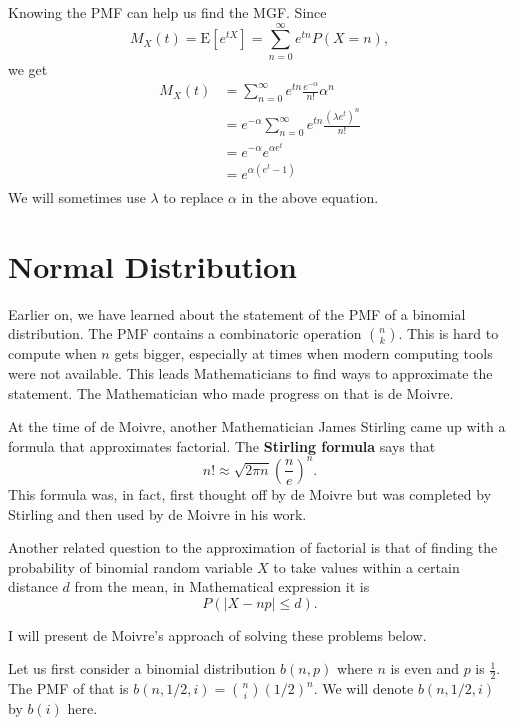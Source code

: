 \documentclass[11pt, a4paper, oneside]{book}
\theoremstyle{definition}
\newcommand{\E}[1]{\text{E}[#1]}
\begin{document}
\noindent Knowing the PMF can help us find the MGF. Since \[
M_X(t) = \E{e^{tX}} =\sum_{n=0}^{\infty} e^{tn}P(X=n),
\]
we get
\begin{equation*}
\begin{split}
M_X(t) &= \sum_{n=0}^{\infty} e^{tn}\frac{e^{-\alpha}}{n!}\alpha^n \\
&= e^{-\alpha} \sum_{n=0}^{\infty} e^{tn}\frac{(\lambda e^{t})^n}{n!} \\
&= e^{-\alpha} e^{\alpha e^t} \\ 
&= e^{\alpha(e^t - 1)} \\ 
\end{split}
\end{equation*}
We will sometimes use $\lambda$ to replace $\alpha$ in the above equation. 

\section{Normal Distribution}

\noindent Earlier on, we have learned about the statement of the PMF of a binomial distribution. The PMF contains a combinatoric operation $n \choose k$. This is hard to compute when $n$ gets bigger, especially at times when modern computing tools were not available. This leads Mathematicians to find ways to approximate the statement. The Mathematician who made progress on that is de Moivre.

\noindent At the time of de Moivre, another Mathematician James Stirling came up with a formula that approximates factorial. The \textbf{Stirling formula} says that\[
n! \approx \sqrt{2\pi n}(\frac{n}{e})^n.
\] 
This formula was, in fact, first thought off by de Moivre but was completed by Stirling and then used by de Moivre in his work. 

\noindent Another related question to the approximation of factorial is that of finding the probability of binomial random variable $X$ to take values within a certain distance $d$ from the mean, in Mathematical expression it is\[
P(|X - np| \le d).
\]

\noindent I will present de Moivre's approach of solving these problems below. 

\noindent Let us first consider a binomial distribution $b(n,p)$ where $n$ is even and $p$ is $\frac{1}{2}$. The PMF of that is $b(n,1/2,i) = {n \choose i} (1/2)^n$. We will denote $b(n,1/2,i)$ by $b(i)$ here. 
\end{document}
